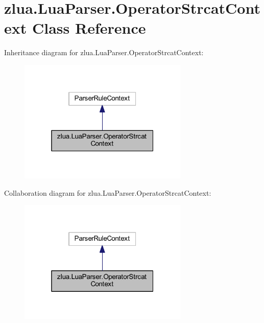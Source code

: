 \hypertarget{classzlua_1_1_lua_parser_1_1_operator_strcat_context}{}\section{zlua.\+Lua\+Parser.\+Operator\+Strcat\+Context Class Reference}
\label{classzlua_1_1_lua_parser_1_1_operator_strcat_context}


Inheritance diagram for zlua.\+Lua\+Parser.\+Operator\+Strcat\+Context\+:
\nopagebreak
\begin{figure}[H]
\begin{center}
\leavevmode
\includegraphics[width=229pt]{classzlua_1_1_lua_parser_1_1_operator_strcat_context__inherit__graph}
\end{center}
\end{figure}


Collaboration diagram for zlua.\+Lua\+Parser.\+Operator\+Strcat\+Context\+:
\nopagebreak
\begin{figure}[H]
\begin{center}
\leavevmode
\includegraphics[width=229pt]{classzlua_1_1_lua_parser_1_1_operator_strcat_context__coll__graph}
\end{center}
\end{figure}
